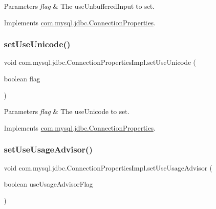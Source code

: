 \begin{DoxyParams}{Parameters}
{\em flag} & The use\+Unbuffered\+Input to set. \\
\hline
\end{DoxyParams}


Implements \mbox{\hyperlink{interfacecom_1_1mysql_1_1jdbc_1_1_connection_properties_a5a30b9513cdbfaf75d822a3942c5bf6b}{com.\+mysql.\+jdbc.\+Connection\+Properties}}.

\mbox{\label{classcom_1_1mysql_1_1jdbc_1_1_connection_properties_impl_a67fda6c70d561a763aa0dd961a5b4dc1}} 
\subsubsection{\texorpdfstring{set\+Use\+Unicode()}{setUseUnicode()}}
{\footnotesize\ttfamily void com.\+mysql.\+jdbc.\+Connection\+Properties\+Impl.\+set\+Use\+Unicode (\begin{DoxyParamCaption}\item[{boolean}]{flag }\end{DoxyParamCaption})}


\begin{DoxyParams}{Parameters}
{\em flag} & The use\+Unicode to set. \\
\hline
\end{DoxyParams}


Implements \mbox{\hyperlink{interfacecom_1_1mysql_1_1jdbc_1_1_connection_properties_a2b78e87d6cfd73e15066b8bdbc0cecb0}{com.\+mysql.\+jdbc.\+Connection\+Properties}}.

\mbox{\label{classcom_1_1mysql_1_1jdbc_1_1_connection_properties_impl_a4140fb151ca7b1288971b1ce6a1dc437}} 
\subsubsection{\texorpdfstring{set\+Use\+Usage\+Advisor()}{setUseUsageAdvisor()}}
{\footnotesize\ttfamily void com.\+mysql.\+jdbc.\+Connection\+Properties\+Impl.\+set\+Use\+Usage\+Advisor (\begin{DoxyParamCaption}\item[{boolean}]{use\+Usage\+Advisor\+Flag }\end{DoxyParamCaption})}

